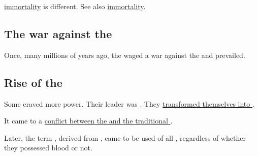 \hyperref[Draconic immortality]{\Draconic{} immortality} is different. See also \hyperref[Malach immortality]{\Malach{} immortality}. 







\subsection{The war against the \ThzanTzais}

Once, many millions of years ago, the \ophidians{} waged a war against the \hyperref[\ThzanTzai]{\thzantzais} and prevailed.







\subsection{Rise of the \draecchonosh}

Some \ophidians{} craved more power. Their leader was \Tiamat. They \hyperref[Origin of Draecchonosh]{transformed themselves into \draecchonosh}. 

It came to a \hyperref[Draecchonosh war]{conflict between the \draecchonosh{} and the traditional \ophidians}.

Later, the term \quo\dragon, derived from \quo\draecchonosh, came to be used of all \ophidians, regardless of whether they possessed \thzantzaic{} blood or not. 







